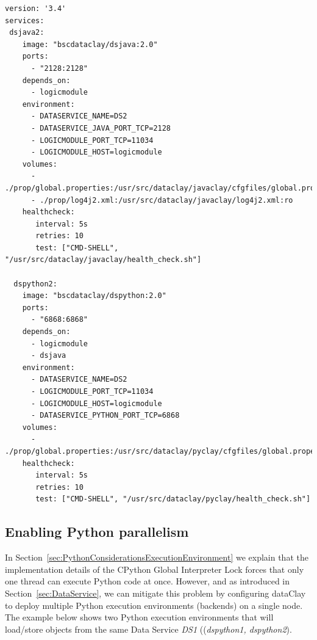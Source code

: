 \begin{tBox}
 \begin{lstlisting}[language=docker-compose-2, frame=none]
version: '3.4'
services:
 dsjava2:
    image: "bscdataclay/dsjava:2.0"
    ports:
      - "2128:2128"
    depends_on:
      - logicmodule
    environment:
      - DATASERVICE_NAME=DS2
      - DATASERVICE_JAVA_PORT_TCP=2128
      - LOGICMODULE_PORT_TCP=11034
      - LOGICMODULE_HOST=logicmodule
    volumes:
      - ./prop/global.properties:/usr/src/dataclay/javaclay/cfgfiles/global.properties:ro
      - ./prop/log4j2.xml:/usr/src/dataclay/javaclay/log4j2.xml:ro
    healthcheck:
       interval: 5s
       retries: 10
       test: ["CMD-SHELL", "/usr/src/dataclay/javaclay/health_check.sh"]
       
  dspython2:
    image: "bscdataclay/dspython:2.0"
    ports:
      - "6868:6868"
    depends_on:
      - logicmodule
      - dsjava
    environment:
      - DATASERVICE_NAME=DS2
      - LOGICMODULE_PORT_TCP=11034
      - LOGICMODULE_HOST=logicmodule
      - DATASERVICE_PYTHON_PORT_TCP=6868
    volumes:
      - ./prop/global.properties:/usr/src/dataclay/pyclay/cfgfiles/global.properties:ro
    healthcheck:
       interval: 5s
       retries: 10
       test: ["CMD-SHELL", "/usr/src/dataclay/pyclay/health_check.sh"]
 \end{lstlisting}
\end{tBox}



\subsection{Enabling Python parallelism}
\label{sec:PythonParallelism}

In Section~\ref{sec:PythonConsiderationsExecutionEnvironment} we explain that the implementation details of the CPython Global Interpreter Lock forces that only one thread can execute Python code at once. However, and as introduced in Section~\ref{sec:DataService}, we can mitigate this problem by configuring dataClay to deploy multiple Python execution environments (backends) on a single node. The example below shows two Python execution environments that will load/store objects from the same Data Service \textit{DS1} ((\textit{dspython1, dspython2}).

